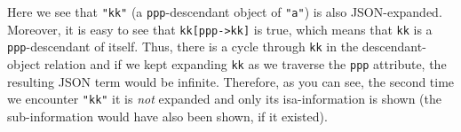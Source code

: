 Here we see that \texttt{"kk"} (a \texttt{ppp}-descendant object of
\texttt{"a"}) is also JSON-expanded. Moreover, it is easy to see that
\texttt{kk[ppp->kk]} is true, which means that \texttt{kk} is a
\texttt{ppp}-descendant of itself. Thus, there is a cycle through
\texttt{kk} in the descendant-object relation and if we kept expanding
\texttt{kk} as we traverse the \texttt{ppp} attribute, the resulting JSON
term would be infinite. Therefore, as you can see, the second time we
encounter \texttt{"kk"} it is \emph{not} expanded and only its
isa-information is shown (the sub-information would have also been shown,
if it existed).





